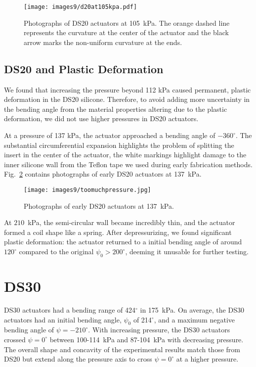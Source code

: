 \begin{figure}[!ht]
    \centering
     \texttt{[image: images9/d20at105kpa.pdf]}
    \caption{Photographs of DS20 actuators at 105~kPa. The orange dashed line represents the curvature at the center of the actuator and the black arrow marks the non-uniform curvature at the ends.}
    \label{fig:d20at105kpa}
\end{figure}

\clearpage
\subsection{DS20 and Plastic Deformation}

We found that increasing the pressure beyond 112 kPa caused permanent, plastic deformation in the DS20 silicone. Therefore, to avoid adding more uncertainty in the bending angle from the material properties altering due to the plastic deformation, we did not use higher pressures in DS20 actuators. 

At a pressure of 137 kPa, the actuator approached a bending angle of $-360^\circ$. The substantial circumferential expansion highlights the problem of splitting the insert in the center of the actuator, the white markings highlight damage to the inner silicone wall from the Teflon tape we used during early fabrication methods. Fig.~\ref{fig:toomuchpressure} contains photographs of early DS20 actuators at 137~kPa. \\

\begin{figure}[!ht]
    \centering
     \texttt{[image: images9/toomuchpressure.jpg]}
    \caption{Photographs of early DS20 actuators at 137~kPa.}
    \label{fig:toomuchpressure}
\end{figure}

At $210$~kPa, the semi-circular wall became incredibly thin, and the actuator formed a coil shape like a spring. After depressurizing, we found significant plastic deformation: the actuator returned to a initial bending angle of around $120^\circ$ compared to the original $\psi_0>200^\circ$, deeming it unusable for further testing. 

\clearpage
\section{DS30}

DS30 actuators had a bending range of 424$^\circ$ in 175~kPa. On average, the DS30 actuators had an initial bending angle, $\psi_0$ of 214$^\circ$, and a maximum negative bending angle of $\psi=-210^\circ$. With increasing pressure, the DS30 actuators crossed $\psi=0^\circ$ between 100-114~kPa and 87-104~kPa with decreasing pressure. The overall shape and concavity of the experimental results match those from DS20 but extend along the pressure axis to cross $\psi=0^\circ$ at a higher pressure. 

